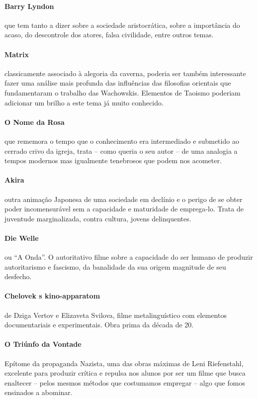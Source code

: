 \documentclass[12pt,a4paper]{article}
\begin{document}
	\paragraph{Barry Lyndon} que tem tanto a dizer sobre a 
		sociedade aristocrática, sobre a importância do
		acaso, do descontrole dos atores, falsa 
		civilidade, entre outros temas.

	\paragraph{Matrix} classicamente associado à alegoria 
		da caverna, poderia ser também interessante 
		fazer uma análise mais profunda das influências 
		das filosofias orientais que fundamentaram o 
		trabalho das Wachowskis. Elementos de Taoismo 
		poderiam adicionar um brilho a este tema já 
		muito conhecido.

	\paragraph{O Nome da Rosa} que rememora o tempo que 
		o conhecimento era intermediado e submetido ao 
		cerrado crivo da igreja, trata -- como queria 
		o seu autor -- de uma analogia a tempos modernos 
		mas igualmente tenebrosos que podem nos acometer.

	\paragraph{Akira} outra animação Japonesa de uma 
		sociedade em declínio e o perigo de se obter 
		poder incomensurável sem a capacidade e 
		maturidade de emprega-lo. Trata de juventude 
		marginalizada, contra cultura, jovens 
		delinquentes.

	\paragraph{Die Welle} ou ``A Onda''. O autoritativo 
		filme sobre a capacidade do ser humano de 
		produzir autoritarismo e fascismo, da banalidade
		da sua origem magnitude de seu desfecho.

	\paragraph{Chelovek s kino-apparatom} de Dziga Vertov e
		Elizaveta Svilova, filme metalinguístico com 
		elementos documentariais e experimentais. Obra 
		prima da década de 20.

	\paragraph{O Triúnfo da Vontade} Epítome da propaganda 
		Nazista, uma das obras máximas de Leni 
		Riefenstahl, excelente para produzir crítica e 
		repulsa nos alunos por ser um filme que busca 
		enaltecer -- pelos mesmos métodos que costumamos 
		empregar -- algo que fomos ensinados a abominar.
		
\end{document}
